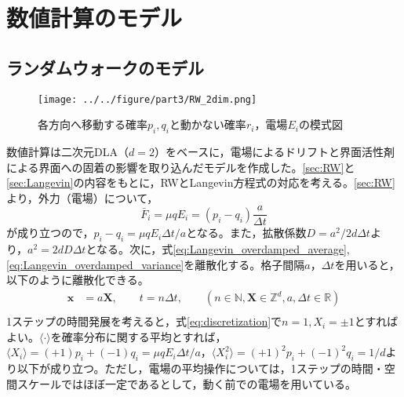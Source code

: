 \documentclass[autodetect-engine,dvi=dvipdfmx,a4paper,ja=standard,oneside,openany,11pt,draft]{bxjsbook}
\begin{document}
\section{数値計算のモデル}
\subsection{ランダムウォークのモデル}
\begin{figure}[htbp]
  \centering
  \texttt{[image: ../../figure/part3/RW\_2dim.png]}
  \caption{各方向へ移動する確率$p_i,q_i$と動かない確率$r_i$，電場$E_i$の模式図}
  \label{fig:RW_2dim}
\end{figure}

数値計算は二次元DLA（$d=2$）をベースに，電場によるドリフトと界面活性剤による界面への固着の影響を取り込んだモデルを作成した。\ref{sec:RW}と\ref{sec:Langevin}の内容をもとに，RWとLangevin方程式の対応を考える。\ref{sec:RW}より，外力（電場）について，
\begin{equation}
  \bar{F}_i=\mu q E_i=(p_i-q_i)\frac{a}{\Delta t}
  \label{eq:force}
\end{equation}が成り立つので，$p_i-q_i=\mu q E_i\Delta t/a$となる。また，拡散係数$D=a^2/2d\Delta t$より，$a^2=2dD\Delta t$となる。次に，式\ref{eq:Langevin_overdamped_average},\ref{eq:Langevin_overdamped_variance}を離散化する。格子間隔$a$，$\Delta t$を用いると，以下のように離散化できる。
\begin{equation}
  \begin{split}
    \bm{x} & =a\bm{X}, \qquad t=n\Delta t, \qquad (n\in\mathbb{N},\bm{X}\in\mathbb{Z}^d,a,\Delta t \in \mathbb{R}) \\
    \label{eq:discretization}
  \end{split}
\end{equation}
1ステップの時間発展を考えると，式\ref{eq:discretization}で$n=1,X_i=\pm1$とすればよい。$\langle\cdot\rangle$を確率分布に関する平均とすれば，$\langle X_i\rangle=(+1)p_i+(-1)q_i=\mu q E_i\Delta t/a$，$\langle X_i^2\rangle=(+1)^2p_i+(-1)^2q_i=1/d$より以下が成り立つ。ただし，電場の平均操作については，1ステップの時間・空間スケールではほぼ一定であるとして，動く前での電場を用いている。
\end{document}

